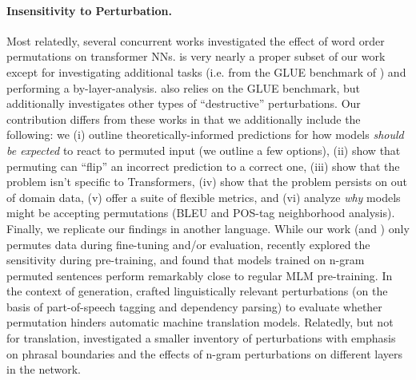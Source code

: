 \documentclass[11pt,a4paper]{article}
\begin{document}
\paragraph{Insensitivity to Perturbation.} Most relatedly, several concurrent works \citep{pham-etal-2020-out, alleman2021syntactic, gupta-etal-2021-bert, sinha2021masked,parthasarathi2021sometimes} investigated the effect of word order permutations on transformer NNs.   is very nearly a proper subset of our work except for investigating additional tasks (i.e. from the GLUE benchmark of \citealt{wang-etal-2018-glue}) and performing a by-layer-analysis.  also relies on the GLUE benchmark, but additionally investigates other types of ``destructive'' perturbations. Our contribution differs from these works %
in that we additionally include the following: we (i) outline theoretically-informed predictions for how models \emph{should be expected} to react to permuted input (we outline a few options), (ii) show that permuting can ``flip'' an incorrect prediction to a correct one, (iii) show that the problem isn't specific to Transformers, (iv) show that the problem persists on out of domain data, (v) offer a suite of flexible metrics, and (vi) analyze \emph{why} models might be accepting permutations (BLEU and POS-tag neighborhood analysis). Finally, we replicate our findings in another language.
While our work (and \citeauthor{pham-etal-2020-out,gupta-etal-2021-bert}) only permutes data during fine-tuning and/or evaluation, 
recently \citeauthor{sinha2021masked} explored the sensitivity during pre-training, and found that models trained on n-gram permuted sentences perform remarkably close to regular MLM pre-training.
In the context of generation,  crafted linguistically relevant perturbations (on the basis of part-of-speech tagging and dependency parsing) to evaluate whether permutation hinders automatic machine translation models. Relatedly, but not for translation,  investigated a smaller inventory of perturbations with emphasis on phrasal boundaries and the effects of n-gram perturbations on different layers in the network. %
\end{document}
